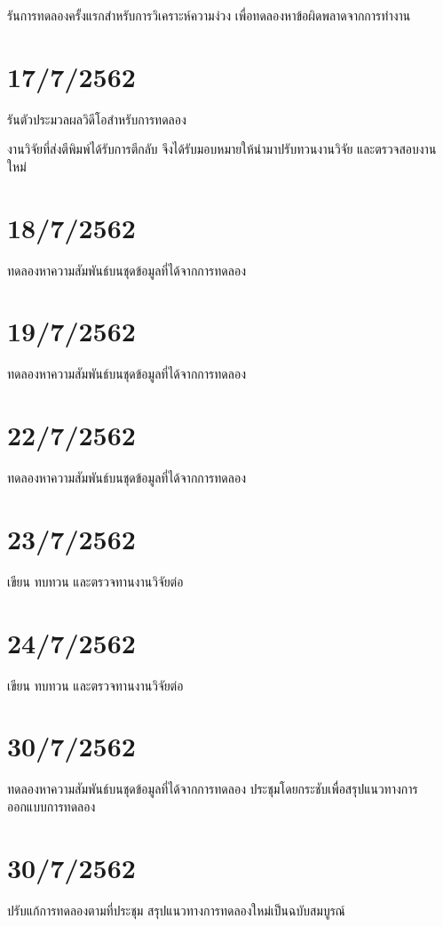 รันการทดลองครั้งแรกสำหรับการวิเคราะห์ความง่วง เพื่อทดลองหาข้อผิดพลาดจากการทำงาน

\section*{17/7/2562}

รันตัวประมวลผลวิดีโอสำหรับการทดลอง

งานวิจัยที่ส่งตีพิมพ์ได้รับการตีกลับ จึงได้รับมอบหมายให้นำมาปรับทวนงานวิจัย และตรวจสอบงานใหม่

\section*{18/7/2562}

ทดลองหาความสัมพันธ์บนชุดข้อมูลที่ได้จากการทดลอง

\section*{19/7/2562}

ทดลองหาความสัมพันธ์บนชุดข้อมูลที่ได้จากการทดลอง

\section*{22/7/2562}

ทดลองหาความสัมพันธ์บนชุดข้อมูลที่ได้จากการทดลอง

\section*{23/7/2562}

เขียน ทบทวน และตรวจทานงานวิจัยต่อ

\section*{24/7/2562}

เขียน ทบทวน และตรวจทานงานวิจัยต่อ

\section*{30/7/2562}

ทดลองหาความสัมพันธ์บนชุดข้อมูลที่ได้จากการทดลอง ประชุมโดยกระชับเพื่อสรุปแนวทางการออกแบบการทดลอง

\section*{30/7/2562}

ปรับแก้การทดลองตามที่ประชุม สรุปแนวทางการทดลองใหม่เป็นฉบับสมบูรณ์